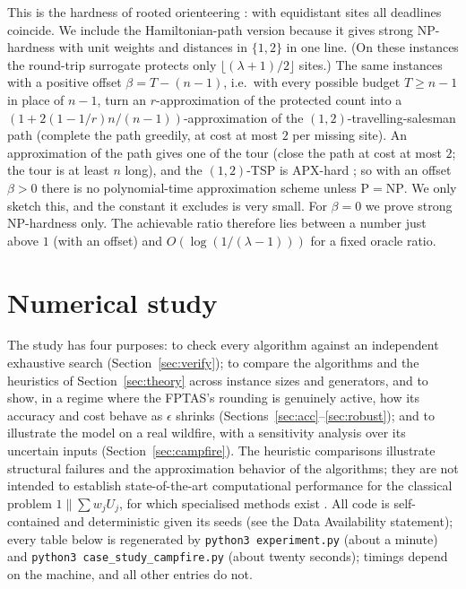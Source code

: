 \documentclass[pdflatex,sn-mathphys-ay]{sn-jnl}
\theoremstyle{thmstyleone}
\theoremstyle{thmstyletwo}
\theoremstyle{thmstylethree}
\begin{document}
This is the hardness of rooted orienteering \citep{golden1987,blum2007}: with
equidistant sites all deadlines coincide. We include the Hamiltonian-path
version because it gives strong NP-hardness with unit weights and distances in
$\{1,2\}$ in one line. (On these instances the round-trip surrogate protects only
$\lfloor(\lambda+1)/2\rfloor$ sites.) The same instances with a positive offset $\beta=T-(n-1)$, i.e.\ with
every possible budget $T\ge n-1$ in place of $n-1$, turn an $r$-approximation of
the protected count into a $(1+2(1-1/r)n/(n-1))$-approximation of the
$(1,2)$-travelling-salesman path (complete the path greedily, at cost at most
$2$ per missing site). An approximation of the path gives one of the tour
(close the path at cost at most $2$; the tour is at least $n$ long), and
the $(1,2)$-TSP is APX-hard \citep{papadimitriou1993}; so with an offset
$\beta>0$ there is no polynomial-time approximation scheme unless
$\mathrm P=\mathrm{NP}$. We only sketch this, and the constant it excludes is very small. For
$\beta=0$ we prove strong NP-hardness only. The achievable ratio therefore lies
between a number just above $1$ (with an offset) and
$O(\log(1/(\lambda-1)))$ for a fixed oracle ratio.

\section{Numerical study}\label{sec:experiments}

The study has four purposes: to check every algorithm against an
independent exhaustive search (Section~\ref{sec:verify}); to compare the
algorithms and the heuristics of Section~\ref{sec:theory} across
instance sizes and generators, and to show, in a regime where the
FPTAS's rounding is genuinely active, how its accuracy and cost behave
as $\epsilon$ shrinks (Sections~\ref{sec:acc}--\ref{sec:robust}); and
to illustrate the model on a real wildfire, with a sensitivity analysis
over its uncertain inputs (Section~\ref{sec:campfire}). The heuristic comparisons illustrate structural failures and the
approximation behavior of the algorithms; they are not intended to establish
state-of-the-art computational performance for the classical problem
$1\|\sum w_jU_j$, for which specialised methods exist
\citep[e.g.][]{antonov2026}. All code is
self-contained and deterministic given its seeds (see the Data
Availability statement); every table below is regenerated by
\texttt{python3 experiment.py} (about a minute) and
\texttt{python3 case\_study\_campfire.py} (about twenty seconds); timings
depend on the machine, and all other entries do not.
\end{document}
